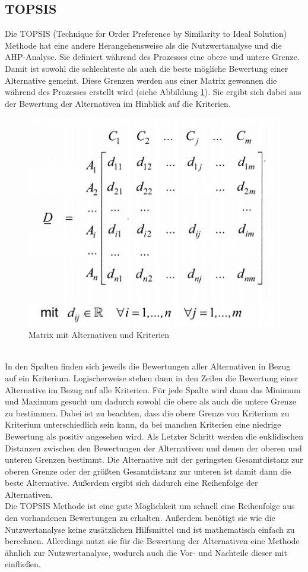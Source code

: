 \subsection{TOPSIS}
Die TOPSIS (Technique for Order Preference by Similarity to Ideal Solution) Methode hat eine andere Herangehensweise als die Nutzwertanalyse und die AHP-Analyse. Sie definiert während des Prozesses eine obere und untere Grenze. Damit ist sowohl die schlechteste als auch die beste mögliche Bewertung einer Alternative gemeint. Diese Grenzen werden aus einer Matrix gewonnen die während des Prozesses erstellt wird (siehe Abbildung \ref{img:topsis}). Sie ergibt sich dabei aus der Bewertung der Alternativen im Hinblick auf die Kriterien.
\begin{figure}[h!]
	\centering
	\includegraphics[scale = 0.7]{img/TOPSIS.png}
	\caption{Matrix mit Alternativen und Kriterien}
	\label{img:topsis}
\end{figure}\\
In den Spalten finden sich jeweils die Bewertungen aller Alternativen in Bezug auf ein Kriterium. Logischerweise stehen dann in den Zeilen die Bewertung einer Alternative im Bezug auf alle Kriterien. Für jede Spalte wird dann das Minimum und Maximum gesucht um dadurch sowohl die obere als auch die untere Grenze zu bestimmen. Dabei ist zu beachten, dass die obere Grenze von Kriterium zu Kriterium unterschiedlich sein kann, da bei manchen Kriterien eine niedrige Bewertung als positiv angesehen wird. Als Letzter Schritt werden die euklidischen Distanzen zwischen den Bewertungen der Alternativen und denen der oberen und unteren Grenzen bestimmt. Die Alternative mit der geringsten Gesamtdistanz zur oberen Grenze oder der größten Gesamtdistanz zur unteren ist damit dann die beste Alternative. Außerdem ergibt sich dadurch eine Reihenfolge der Alternativen.\\
Die TOPSIS Methode ist eine gute Möglichkeit um schnell eine Reihenfolge aus den vorhandenen Bewertungen zu erhalten. Außerdem benötigt sie wie die Nutzwertanalyse keine zusätzlichen Hilfsmittel und ist mathematisch einfach zu berechnen. Allerdings nutzt sie für die Bewertung der Alternativen eine Methode ähnlich zur Nutzwertanalyse, wodurch auch die Vor- und Nachteile dieser mit einfließen.
